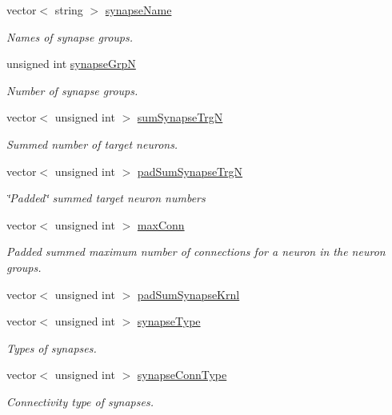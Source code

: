 \begin{DoxyCompactItemize}
vector$<$ string $>$ \hyperlink{classNNmodel_a13993564faeb0e67a21b3c9ffababaf1}{synapse\+Name}
\begin{DoxyCompactList}\small\item\em Names of synapse groups. \end{DoxyCompactList}\item 
unsigned int \hyperlink{classNNmodel_a1e6209fc2014ab9f1820a614cc246c67}{synapse\+Grp\+N}
\begin{DoxyCompactList}\small\item\em Number of synapse groups. \end{DoxyCompactList}\item 
vector$<$ unsigned int $>$ \hyperlink{classNNmodel_a03e34fda1008acf6379f80e8d713d41b}{sum\+Synapse\+Trg\+N}
\begin{DoxyCompactList}\small\item\em Summed number of target neurons. \end{DoxyCompactList}\item 
vector$<$ unsigned int $>$ \hyperlink{classNNmodel_a73881a9d190c544cc6add9a19ee6a304}{pad\+Sum\+Synapse\+Trg\+N}
\begin{DoxyCompactList}\small\item\em \char`\"{}\+Padded\char`\"{} summed target neuron numbers \end{DoxyCompactList}\item 
vector$<$ unsigned int $>$ \hyperlink{classNNmodel_afd62bf5791467b37ef06b025ae419d36}{max\+Conn}
\begin{DoxyCompactList}\small\item\em Padded summed maximum number of connections for a neuron in the neuron groups. \end{DoxyCompactList}\item 
vector$<$ unsigned int $>$ \hyperlink{classNNmodel_a7c0e09e6fe2327601cc9b1e2e995b0e9}{pad\+Sum\+Synapse\+Krnl}
\item 
vector$<$ unsigned int $>$ \hyperlink{classNNmodel_a5945dd8a2936f38a5997a5cae51cf706}{synapse\+Type}
\begin{DoxyCompactList}\small\item\em Types of synapses. \end{DoxyCompactList}\item 
vector$<$ unsigned int $>$ \hyperlink{classNNmodel_a0b1d2c6f24b8ed9215dce9daf3ca0518}{synapse\+Conn\+Type}
\begin{DoxyCompactList}\small\item\em Connectivity type of synapses. \end{DoxyCompactList}\item 

\end{DoxyCompactItemize}
